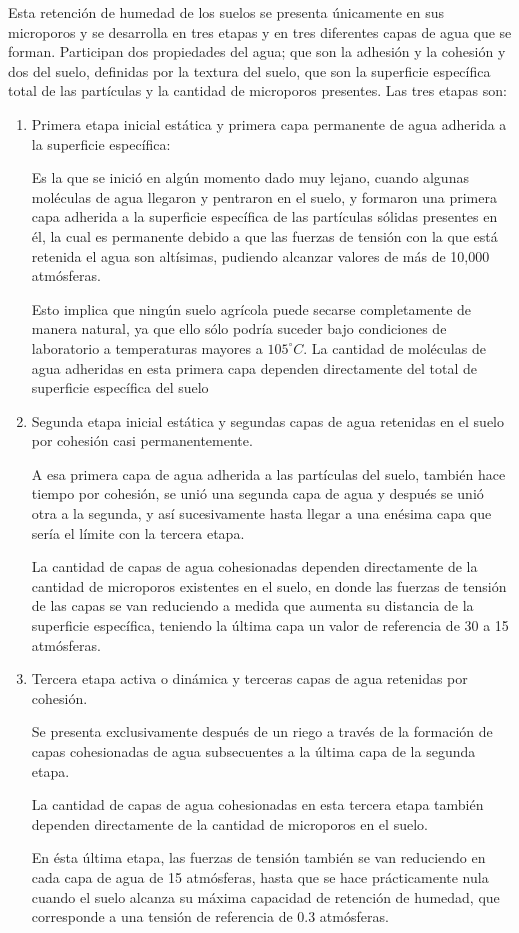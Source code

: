 Esta retención de humedad de los suelos se presenta únicamente en sus microporos y se desarrolla en tres etapas y en tres diferentes capas de agua que se forman. Participan dos propiedades del agua; que son la adhesión y la cohesión y dos del suelo, definidas por la textura del suelo, que son la superficie específica total de las partículas y la cantidad de microporos presentes. Las tres etapas son:
\begin{enumerate}
\item Primera etapa inicial estática y primera capa permanente de agua adherida a la superficie específica:

Es la que se inició en algún momento dado muy lejano, cuando algunas moléculas de agua llegaron y pentraron en el suelo, y formaron una primera capa adherida a la superficie específica de las partículas sólidas presentes en él, la cual es permanente debido a que las fuerzas de tensión con la que está retenida el agua son altísimas, pudiendo alcanzar valores de más de 10,000 atmósferas.

Esto implica que ningún suelo agrícola puede secarse completamente de manera natural, ya que ello sólo podría suceder bajo condiciones de laboratorio a temperaturas mayores a $105^{\circ}C$. La cantidad de moléculas de agua adheridas en esta primera capa dependen directamente del total de superficie específica del suelo


\item Segunda etapa inicial estática y segundas capas de agua retenidas en el suelo por cohesión casi permanentemente.

A esa primera capa de agua adherida a las partículas del suelo, también hace tiempo por cohesión, se unió una segunda capa de agua y después se unió otra a la segunda, y así sucesivamente hasta llegar a una enésima capa que sería el límite con la tercera etapa.

La cantidad de capas de agua cohesionadas dependen directamente de la cantidad de microporos existentes en el suelo, en donde las fuerzas de tensión de las capas se van reduciendo a medida que aumenta su distancia de la superficie específica, teniendo la última capa un valor de referencia de 30 a 15 atmósferas.
\item Tercera etapa activa o dinámica y terceras capas de agua retenidas por cohesión.

Se presenta exclusivamente después de un riego a través de la formación de
capas cohesionadas de agua subsecuentes a la última capa de la segunda
etapa.

La cantidad de capas de agua cohesionadas en esta tercera etapa también
dependen directamente de la cantidad de microporos en el suelo.

En ésta última etapa, las fuerzas de tensión también se van reduciendo en cada
capa de agua de 15 atmósferas, hasta que se hace prácticamente nula cuando
el suelo alcanza su máxima capacidad de retención de humedad, que
corresponde a una tensión de referencia de 0.3 atmósferas.
\end{enumerate}
